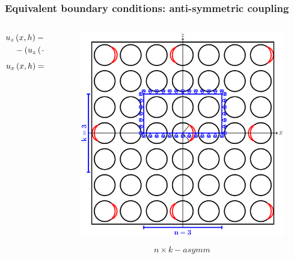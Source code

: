 \documentclass[first,firstsupp,lastsupp,last,hyperref,table]{ETHclass}
\begin{document}
\begin{frame}
\frametitle{\vspace{0.2cm}\small Equivalent boundary conditions: anti-symmetric coupling}
\vspace{-1.25cm}
\centering
\begin{columns}[c]
\begin{column}{0.5\textwidth}
\centering
\begin{equation*}
\begin{split}
\scriptsize
u_{z}&\left(x,h\right)-u_{z}\left(0,h\right)=\\&-\left(u_{z}\left(-x,h\right)-u_{z}\left(0,h\right)\right)
\end{split}
\end{equation*}
\begin{equation*}
\scriptsize
u_{x}\left(x,h\right)=-u_{x}\left(-x,h\right)
\end{equation*}
\end{column}
\begin{column}{0.5\textwidth}
\centering
\begin{figure}
\centering
\includegraphics[width=\columnwidth]{asymm.pdf}
\end{figure}
\vspace{-0.25cm}
\begin{equation*}
n\times k-asymm
\end{equation*}
\end{column}
\end{columns}
\end{frame}
\end{document}
